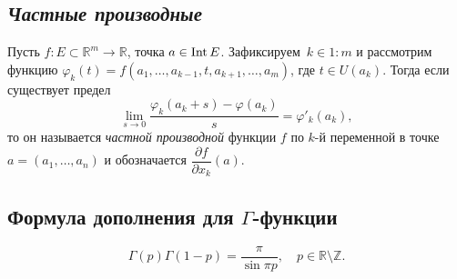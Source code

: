 \subsection{\itshape Частные производные}

\begin{definition}
	Пусть \(f \colon E \subset \mathbb{R}^m \to \mathbb{R}\), точка \(a \in \operatorname{Int} E\). Зафиксируем~\(k \in 1 \colon m\) и рассмотрим функцию \(\varphi_k (t) = f(a_1, \ldots, a_{k-1}, t, a_{k+1}, \ldots, a_m)\), где \(t \in U(a_k)\). Тогда если существует предел \[
		\lim_{s \to 0} \frac{\varphi_k(a_k + s) - \varphi(a_k)}{s} = \varphi'_k (a_k),	
	\]
	то он называется \textit{частной производной} функции \(f\) по \(k\)-й переменной в точке \(a = (a_1, \ldots, a_n)\) и обозначается \(\dfrac{\partial f}{\partial x_k} (a)\).
\end{definition}

\subsection{Формула дополнения для \(\Gamma\)-функции}

\begin{theorem}
	\[
		\Gamma(p) \Gamma(1 - p) = \frac{\pi}{\sin \pi p}, \quad p \in \mathbb{R} \setminus \mathbb{Z}.	
	\]
\end{theorem}
